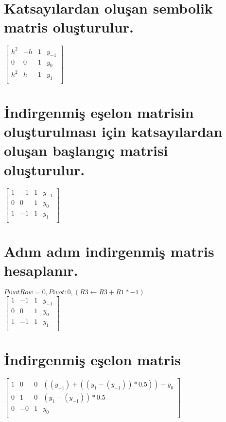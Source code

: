 \documentclass{article}
\begin{document}
\section{Katsayılardan oluşan sembolik matris oluşturulur.}
\begin{center}
$\begin{bmatrix}
h^2&-h&1&y_{-1}\\
0&0&1&y_{0}\\
h^2&h&1&y_{1}\\
\end{bmatrix} $
\end{center}

\section{İndirgenmiş eşelon matrisin oluşturulması için katsayılardan oluşan başlangıç matrisi oluşturulur.}
\begin{center}
$\begin{bmatrix}
1&-1&1&y_{-1}\\
0&0&1&y_{0}\\
1&-1&1&y_{1}\\
\end{bmatrix} $
\end{center}

\section{Adım adım indirgenmiş matris hesaplanır.}
\begin{center}
$PivotRow= 0, Pivot: 0, (R3 \leftarrow R3 + R1 * -1) $\\
$\begin{bmatrix}
1&-1&1&y_{-1}\\
0&0&1&y_{0}\\
1&-1&1&y_{1}\\
\end{bmatrix} $
\end{center}

\section{İndirgenmiş eşelon matris}
\begin{center}
$\begin{bmatrix}
1&0&0&((y_{-1}) + ((y_{1} - (y_{-1})) * 0.5)) - y_{0}\\
0&1&0&(y_{1} - (y_{-1})) * 0.5\\
0&-0&1&y_{0}\\
\end{bmatrix} $
\end{center}
\end{document}
